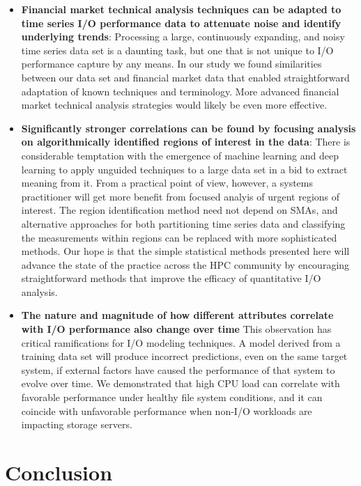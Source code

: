 \begin{itemize}

\item \textbf{Financial market technical analysis techniques can be adapted
to time series I/O performance data to attenuate noise and identify
underlying trends}: Processing a large, continuously expanding, and noisy
time series data set is a daunting task, but one that is not unique to I/O
performance capture by any means.  In our study we found similarities
between our data set and financial market data that enabled straightforward
adaptation of known techniques and terminology.  More advanced financial
market technical analysis strategies would likely be even more effective.

\item \textbf{Significantly stronger correlations can be found by focusing
analysis on algorithmically identified regions of interest in the data}:
There is considerable temptation with the emergence of machine learning and
deep learning to apply unguided techniques to a large data set in a bid to
extract meaning from it. From a practical point of view, however, a systems
practitioner will get more benefit from focused analyis of urgent regions of
interest.  The region identification method need not depend on SMAs, and alternative
approaches for both partitioning time series data and classifying the
measurements within regions can be replaced with more sophisticated methods.
Our hope is that the simple statistical methods presented here will advance
the state of the practice across the HPC community by encouraging
straightforward methods that improve the efficacy of quantitative I/O analysis.

\item \textbf{The nature and magnitude of how different attributes correlate
with I/O performance also change over time}  This observation has critical
ramifications for I/O modeling techniques.  A model derived from a training data set
will produce incorrect predictions, even on the same target system, if
external factors have caused the performance of that system to evolve over
time. We demonstrated that high CPU load can correlate with favorable performance under healthy file system conditions, and it can coincide with unfavorable performance when non-I/O workloads are impacting storage servers.

\end{itemize}

\section{Conclusion} \label{sec:conclusions}

